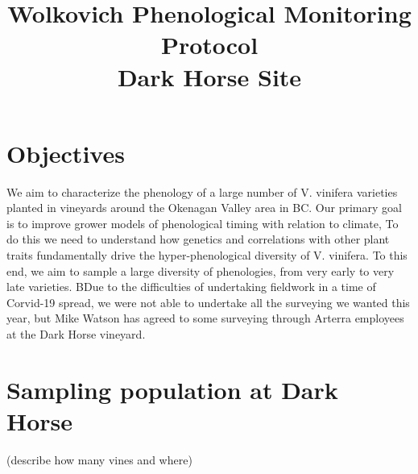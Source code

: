 \documentclass[11pt,letter]{article}
\begin{document}

\renewcommand{\refname}{\CHead{}}

\title{Wolkovich Phenological Monitoring Protocol\\
Dark Horse Site}
\date{ }
\maketitle
\tableofcontents

\section{Objectives}
We aim to characterize the phenology of a large number of V. vinifera varieties planted in vineyards around the Okenagan Valley area in BC. Our primary goal is to improve grower models of phenological timing with relation to climate, To do this we need to understand how genetics and correlations with other plant traits fundamentally drive the hyper-phenological diversity of V. vinifera. To this end, we aim to sample a large diversity of phenologies, from very early to very late varieties. BDue to the difficulties of undertaking fieldwork in a time of Corvid-19 spread, we were not able to undertake all the surveying we wanted this year, but Mike Watson has agreed to some surveying through Arterra employees at the Dark Horse vineyard.

\section{Sampling population at Dark Horse}
(describe how many vines and where)
\end{document}
